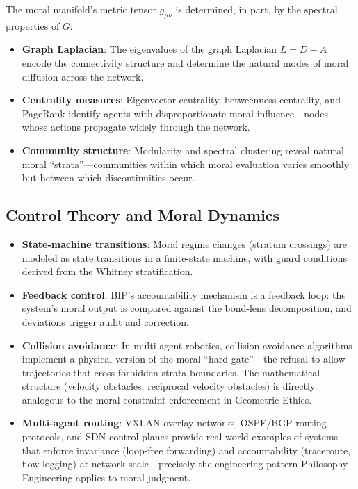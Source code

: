 \documentclass[12pt,letterpaper]{article}
\theoremstyle{definition}
\theoremstyle{plain}
\begin{document}
The moral manifold's metric tensor $g_{\mu\nu}$ is determined, in part, by the spectral properties of $G$:
\begin{itemize}
    \item \textbf{Graph Laplacian}: The eigenvalues of the graph Laplacian $L = D - A$ encode the connectivity structure and determine the natural modes of moral diffusion across the network.
    \item \textbf{Centrality measures}: Eigenvector centrality, betweenness centrality, and PageRank identify agents with disproportionate moral influence---nodes whose actions propagate widely through the network.
    \item \textbf{Community structure}: Modularity and spectral clustering reveal natural moral ``strata''---communities within which moral evaluation varies smoothly but between which discontinuities occur.
\end{itemize}

\subsection{Control Theory and Moral Dynamics}

\begin{itemize}
    \item \textbf{State-machine transitions}: Moral regime changes (stratum crossings) are modeled as state transitions in a finite-state machine, with guard conditions derived from the Whitney stratification.
    \item \textbf{Feedback control}: BIP's accountability mechanism is a feedback loop: the system's moral output is compared against the bond-lens decomposition, and deviations trigger audit and correction.
    \item \textbf{Collision avoidance}: In multi-agent robotics, collision avoidance algorithms implement a physical version of the moral ``hard gate''---the refusal to allow trajectories that cross forbidden strata boundaries. The mathematical structure (velocity obstacles, reciprocal velocity obstacles) is directly analogous to the moral constraint enforcement in Geometric Ethics.
    \item \textbf{Multi-agent routing}: VXLAN overlay networks, OSPF/BGP routing protocols, and SDN control planes provide real-world examples of systems that enforce invariance (loop-free forwarding) and accountability (traceroute, flow logging) at network scale---precisely the engineering pattern Philosophy Engineering applies to moral judgment.
\end{itemize}
\end{document}
